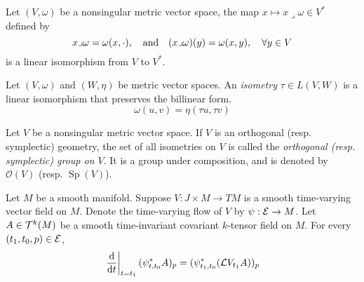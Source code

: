 \documentclass[../main-manifolds.tex]{subfiles}
\begin{document}
    
    
\begin{wts}
    Let $(V,\omega)$ be a nonsingular metric vector space, the map $x\mapsto x\lrcorner \omega\in V^*$ defined by
    \[
        x\lrcorner\omega = \omega(x,\cdot),\qqtext{and}(x\lrcorner\omega)(y) = \omega(x,y),\quad\forall y\in V
    \]
    is a linear isomorphism from $V$ to $V^*$. 
\end{wts}

\begin{definition}
    Let $(V,\omega)$ and $(W, \eta)$ be metric vector spaces. An \emph{isometry} $\tau\in L(V,W)$ is a linear isomorphism that preserves the billinear form.
    \[
        \omega(u,v) = \eta(\tau u, \tau v)
    \]
\end{definition}
\begin{definition}
    Let $V$ be a nonsingular metric vector space. If $V$ is an orthogonal (resp. symplectic) geometry, the set of all isometries on $V$ is called the \emph{orthogonal (resp. symplectic) group on $V$}. It is a group under composition, and is denoted by $\mathcal{O}(V)$ (resp. $\operatorname{Sp}(V)$).
\end{definition}





\begin{wts}\label{lee-chp22:prop-22.14}
    Let $M$ be a smooth manifold. Suppose $V: J\times M\to TM$ is a smooth time-varying vector field on $M$. Denote the time-varying flow of $V$ by $\psi:\mathcal{E}\to M$. Let $A\in \mathcal{T}^k(M)$ be a smooth time-invariant covariant $k$-tensor field on $M$. For every $(t_1, t_0, p)\in \mathcal{E}$,
    \begin{equation}\label{prop-22.14-eq-1}
        \eval{\dv{t}}_{t=t_1}(\psi^*_{t,t_0}A)_p = (\psi^*_{t_1,t_0}(\mathcal{L}V_{t_1} A))_p
    \end{equation}
\end{wts}
\end{document}
